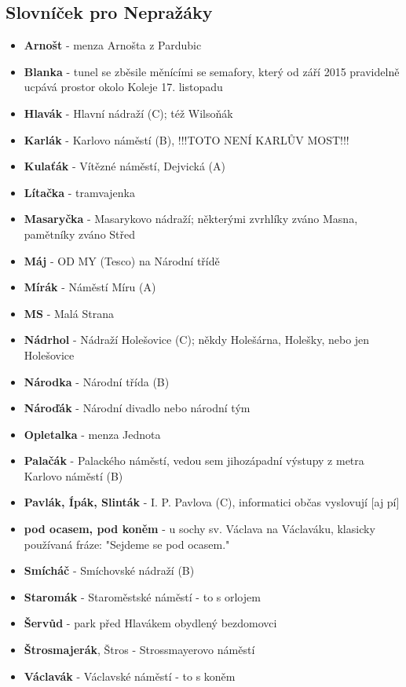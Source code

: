 \subsection{Slovníček pro Nepražáky}
\begin{itemize}
\item \textbf{Arnošt} - menza Arnošta z Pardubic
\item \textbf{Blanka} - tunel se zběsile měnícími se semafory, který od září 2015 pravidelně ucpává prostor okolo Koleje 17. listopadu
\item \textbf{Hlavák} - Hlavní nádraží (C); též Wilsoňák
\item \textbf{Karlák} - Karlovo náměstí (B), !!!TOTO NENÍ KARLŮV MOST!!!
\item \textbf{Kulaťák} - Vítězné náměstí, Dejvická (A)
\item \textbf{Lítačka} - tramvajenka
\item \textbf{Masaryčka} - Masarykovo nádraží; některými zvrhlíky zváno Masna, pamětníky zváno Střed
\item \textbf{Máj} - OD MY (Tesco) na Národní třídě
\item \textbf{Mírák} - Náměstí Míru (A)
\item \textbf{MS} - Malá Strana
\item \textbf{Nádrhol} - Nádraží Holešovice (C); někdy Holešárna, Holešky, nebo jen Holešovice
\item \textbf{Národka} - Národní třída (B)
\item \textbf{Nároďák} - Národní divadlo nebo národní tým
\item \textbf{Opletalka} - menza Jednota
\item \textbf{Palačák} - Palackého náměstí, vedou sem jihozápadní výstupy z metra Karlovo náměstí (B)
\item \textbf{Pavlák, Ípák, Slinták} - I. P. Pavlova (C), informatici občas vyslovují [aj pí]
\item \textbf{pod ocasem, pod koněm} - u sochy sv. Václava na Václaváku, klasicky používaná fráze: "Sejdeme se pod ocasem."
\item \textbf{Smícháč} - Smíchovské nádraží (B)
\item \textbf{Staromák} - Staroměstské náměstí - to s orlojem
\item \textbf{Šervůd} - park před Hlavákem obydlený bezdomovci
\item \textbf{Štrosmajerák}, Štros - Strossmayerovo náměstí
\item \textbf{Václavák} - Václavské náměstí - to s koněm
\end{itemize}
